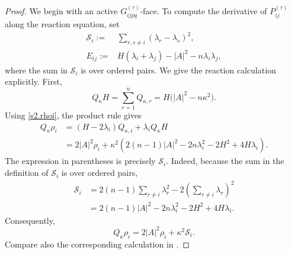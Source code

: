 \documentclass[11pt,reqno]{amsart}
\theoremstyle{definition}
\theoremstyle{remark}
\numberwithin{equation}{section}
\begin{document}
\begin{proof}
We begin with an active $G_{ijpq}^{(\tau)}$-face.  To compute the derivative of
$P_{ij}^{(\tau)}$ along the reaction equation, set
\begin{align*}
 \mathcal S_i
 :=&\sum_{r,s\ne i}(\lambda_r-\lambda_s)^2,\\
 E_{ij}:=&H(\lambda_i+\lambda_j)-|A|^2-n\lambda_i\lambda_j,
\end{align*}
where the sum in $\mathcal S_i$ is over ordered pairs.  We give the
reaction calculation explicitly.  First,
\begin{equation}\label{s2.QkH}
 Q_\kappa H
 =\sum_{r=1}^n Q_{\kappa,r}
 =H\bigl(|A|^2-n\kappa^2\bigr).
\end{equation}
Using \eqref{s2.rhoi},  the product rule gives
\begin{align*}
 Q_\kappa\rho_i
 &= (H-2\lambda_i)Q_{\kappa,i}
    +\lambda_iQ_\kappa H\\
 &=2|A|^2\rho_i
   +\kappa^2\left(
      2(n-1)|A|^2-2n\lambda_i^2
      -2H^2+4H\lambda_i
   \right).
\end{align*}
The expression in parentheses is precisely $\mathcal S_i$.  Indeed,
because the sum in the definition of $\mathcal S_i$ is over ordered
pairs,
\begin{align*}
 \mathcal S_i
 &=2(n-1)\sum_{r\ne i}\lambda_r^2
   -2\left(\sum_{r\ne i}\lambda_r\right)^2\\
 &=2(n-1)|A|^2-2n\lambda_i^2
   -2H^2+4H\lambda_i.
\end{align*}
Consequently,
\begin{equation}\label{s2.Qrho}
 Q_\kappa\rho_i
 =2|A|^2\rho_i+\kappa^2\mathcal S_i.
\end{equation}
Compare also the corresponding calculation in \cite{AC17}.


\end{proof}
\end{document}
